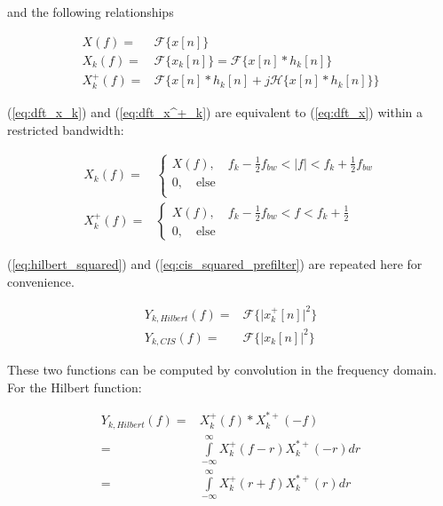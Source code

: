 \documentclass [11pt, proquest,oneside] {ganter_thesis}[2015/03/03]
\begin{document}
and the following relationships

\begin{align}
\label{eq:dft_x}
X(f) =& \mathcal{F}\Big\{ x[n] \Big\} \\
%
\label{eq:dft_x_k}
X_{k}(f) =& \mathcal{F}\Big\{ x_k[n] \Big\} = \mathcal{F}\Big\{ x[n] * h_k[n] \Big\} \\
%
\label{eq:dft_x^+_k}
X^+_{k}(f) =& \mathcal{F}\Big\{ x[n] * h_k[n] + j\mathcal{H} \big\{ x[n] * h_k[n] \big\} \Big\}
\end{align}

(\ref{eq:dft_x_k}) and (\ref{eq:dft_x^+_k}) are equivalent to (\ref{eq:dft_x}) within a restricted bandwidth:

\begin{align}
\label{eq:X_k_bounds}
X_{k}(f) =& \left\{
                \begin{array}{ll}
X(f), \quad f_k - \frac{1}{2} f_{bw} < |f| < f_k + \frac{1}{2} f_{bw} \\
0, \quad \mathrm{else} \\
                \end{array}
              \right. \\
\label{eq:X^+_k_bounds}
X^+_{k}(f) =& \left\{
                \begin{array}{ll}
X(f), \quad f_k - \frac{1}{2} f_{bw} < f < f_k + \frac{1}{2} \\
0, \quad \mathrm{else}
                \end{array}
              \right.
\end{align}

(\ref{eq:hilbert_squared}) and (\ref{eq:cis_squared_prefilter}) are repeated here for convenience.

\begin{align}
Y_{k,Hilbert}(f) =& \mathcal{F}\Big\{ \Big| x^+_k[n] \Big|^2  \Big\} \nonumber \\
Y_{k,CIS}(f) =& \mathcal{F}\Big\{ \Big| x_k[n] \Big|^2  \Big\} \nonumber
\end{align}

These two functions can be computed by convolution in the frequency domain.  For the Hilbert function:

\begin{align}
Y_{k,Hilbert}(f) =& X^+_{k}(f) * X^{*+}_{k}(-f) \nonumber \\
=& \int\limits_{-\infty}^{\infty} X^+_{k}(f - r) X^{*+}_{k}(-r)dr \nonumber \\
=& \int\limits_{-\infty}^{\infty} X^+_{k}(r + f) X^{*+}_{k}(r)dr
\end{align}
\end{document}
